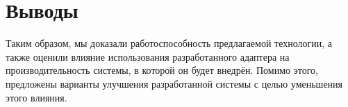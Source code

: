 \section{Выводы} \label{ch4:conclusion}

Таким образом, мы доказали работоспособность предлагаемой технологии, а также оценили влияние использования разработанного адаптера на производительность системы, в которой он будет внедрён.
Помимо этого, предложены варианты улучшения разработанной системы с целью уменьшения этого влияния.


